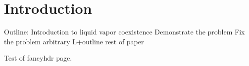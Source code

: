 \section{Introduction}

Outline:
Introduction to liquid vapor coexistence
Demonstrate the problem
Fix the problem
arbitrary L+outline rest of paper

\newpage

Test of fancyhdr page.